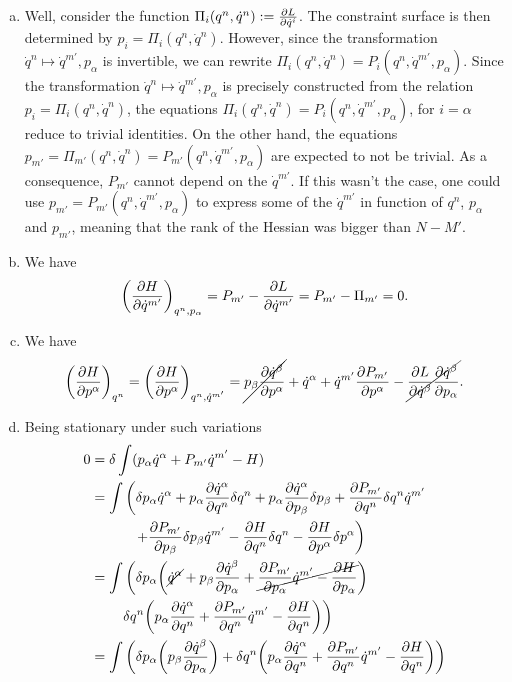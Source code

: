 \documentclass{book}
\begin{document}
\begin{enumerate}[(a)]

\item Well, consider the function $\Pi_i(q^n,\dot{q}^n):=\pdv{L}{\dot{q}^i}$. The constraint surface is then determined by $p_i=\Pi_i(q^n,\dot{q}^n)$. However, since the transformation $\dot{q}^n\mapsto \dot{q}^{m'},p_\alpha$ is invertible, we can rewrite $\Pi_i(q^n,\dot{q}^n)=P_i(q^n,\dot{q}^{m'},p_\alpha)$. Since the transformation $\dot{q}^n\mapsto \dot{q}^{m'},p_\alpha$ is precisely constructed from the relation $p_i=\Pi_i(q^n,\dot{q}^n)$, the equations $\Pi_i(q^n,\dot{q}^n)=P_i(q^n,\dot{q}^{m'},p_\alpha)$, for $i=\alpha$ reduce to trivial identities. On the other hand, the equations $p_{m'}=\Pi_{m'}(q^n,\dot{q}^n)=P_{m'}(q^n,\dot{q}^{m'},p_\alpha)$ are expected to not be trivial. As a consequence, $P_{m'}$ cannot depend on the $\dot{q}^{m'}$. If this wasn't the case, one could use $p_{m'}=P_{m'}(q^n,\dot{q}^{m'},p_\alpha)$ to express some of the $\dot{q}^{m'}$ in function of $q^n$, $p_\alpha$ and $p_{m'}$, meaning that the rank of the Hessian was bigger than $N-M'$.

\item We have
\begin{equation}
\qty(\pdv{H}{\dot{q}^{m'}})_{q^n,p_\alpha}=P_{m'}-\pdv{L}{\dot{q}^{m'}}=P_{m'}-\Pi_{m'}=0.
\end{equation}

\item We have
\begin{equation}
\qty(\pdv{H}{p^\alpha})_{q^n}=\qty(\pdv{H}{p^\alpha})_{q^n,\dot{q}^{m'}}=\cancel{p_\beta\pdv{\dot{q}^\beta}{p^\alpha}}+\dot{q}^\alpha+\dot{q}^{m'}\pdv{P_{m'}}{p^\alpha}-\cancel{\pdv{L}{\dot{q}^\beta}\pdv{\dot{q}^\beta}{p_\alpha}}.
\end{equation}

\item Being stationary under such variations
\begin{equation}
\begin{aligned}
0&=\delta\int(p_\alpha\dot{q}^\alpha+P_{m'}\dot{q}^{m'}-H)\\
&=\int\left(\delta p_\alpha\dot{q}^\alpha+p_\alpha\pdv{\dot{q}^\alpha}{q^n}\delta q^n+p_\alpha\pdv{\dot{q}^\alpha}{p_\beta}\delta p_\beta+\pdv{P_{m'}}{q^n}\delta q^n\dot{q}^{m'}\right.\\
&\hphantom{=\int}\left.\quad+\pdv{P_{m'}}{p_\beta}\delta p_\beta\dot{q}^{m'}-\pdv{H}{q^n}\delta q^n-\pdv{H}{p^\alpha}\delta p^\alpha\right)\\
&=\int\left(\delta p_\alpha\qty(\cancel{\dot{q}^\alpha}+p_\beta\pdv{\dot{q}^\beta}{p_\alpha}+\cancel{\pdv{P_{m'}}{p_\alpha}\dot{q}^{m'}-\pdv{H}{p_\alpha}})\right.\\
&\hphantom{=\int}\left.\delta q^n\qty(p_\alpha\pdv{\dot{q}^\alpha}{q^{n}}+\pdv{P_{m'}}{q^n}\dot{q}^{m'}-\pdv{H}{q^n})\right)\\
&=\int\left(\delta p_\alpha\qty(p_\beta\pdv{\dot{q}^\beta}{p_\alpha})+\delta q^n\qty(p_\alpha\pdv{\dot{q}^\alpha}{q^{n}}+\pdv{P_{m'}}{q^n}\dot{q}^{m'}-\pdv{H}{q^n})\right)
\end{aligned}
\end{equation}


\end{enumerate}
\end{document}
